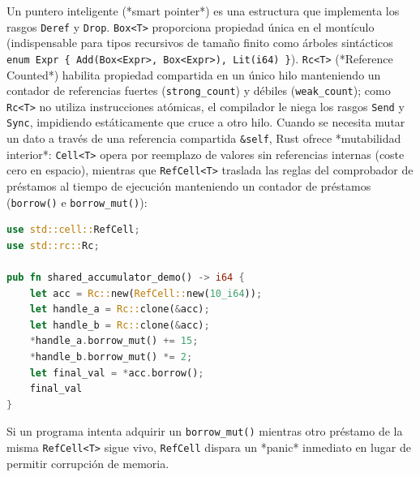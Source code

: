 \documentclass{book}
\begin{document}
Un puntero inteligente (*smart pointer*) es una estructura que implementa los rasgos \texttt{Deref} y \texttt{Drop}. \texttt{Box<T>} proporciona propiedad única en el montículo (indispensable para tipos recursivos de tamaño finito como árboles sintácticos \texttt{enum Expr \{ Add(Box<Expr>, Box<Expr>), Lit(i64) \}}). \texttt{Rc<T>} (*Reference Counted*) habilita propiedad compartida en un único hilo manteniendo un contador de referencias fuertes (\texttt{strong\_count}) y débiles (\texttt{weak\_count}); como \texttt{Rc<T>} no utiliza instrucciones atómicas, el compilador le niega los rasgos \texttt{Send} y \texttt{Sync}, impidiendo estáticamente que cruce a otro hilo. Cuando se necesita mutar un dato a través de una referencia compartida \texttt{\&self}, Rust ofrece *mutabilidad interior*: \texttt{Cell<T>} opera por reemplazo de valores sin referencias internas (coste cero en espacio), mientras que \texttt{RefCell<T>} traslada las reglas del comprobador de préstamos al tiempo de ejecución manteniendo un contador de préstamos (\texttt{borrow()} e \texttt{borrow\_mut()}):
\begin{lstlisting}[style=studium,language={Rust}]
use std::cell::RefCell;
use std::rc::Rc;

pub fn shared_accumulator_demo() -> i64 {
    let acc = Rc::new(RefCell::new(10_i64));
    let handle_a = Rc::clone(&acc);
    let handle_b = Rc::clone(&acc);
    *handle_a.borrow_mut() += 15;
    *handle_b.borrow_mut() *= 2;
    let final_val = *acc.borrow();
    final_val
}
\end{lstlisting}
Si un programa intenta adquirir un \texttt{borrow\_mut()} mientras otro préstamo de la misma \texttt{RefCell<T>} sigue vivo, \texttt{RefCell} dispara un *panic* inmediato en lugar de permitir corrupción de memoria.
\end{document}
